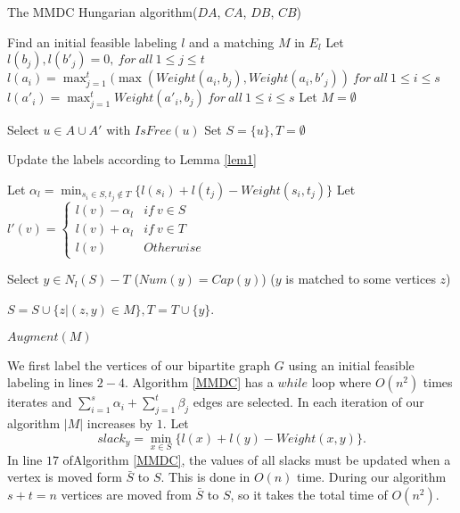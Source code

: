 \documentclass[preprint,12pt]{elsarticle}
\begin{document}
\begin{algorithm}
\caption{The MMDC Hungarian algorithm($DA$, $CA$, $DB$, $CB$)}
\label{MMDC}
\begin{algorithmic}[1]

\Initialize \Comment Find an initial feasible labeling $l$ and a matching $M$ in $E_l$
\State Let $l(b_j), l(b'_j)=0, \ for \ all \ 1 \le j \le t$
\State $l(a_i)=\max_{j=1}^t (\max(Weight(a_i,b_j),Weight(a_i,b'_j))\  for\  all \ 1 \le i \le s$
\State $l(a'_i)=\max_{j=1}^t Weight(a'_i,b_j)$$\  for\  all \ 1 \le i \le s$
\State Let $M=\emptyset$ 
\item[]

 \State Select $u  \in A\cup A'$ with $IsFree(u)$ 
 \State Set $S = \{u\}, T =\emptyset$
\item[]
  \Repeat
        \Statex \Comment Update the labels according to Lemma \ref{lem1}

\State Let $\alpha_l=\min_{s_i \in S, t_j \notin T}\{l(s_i)+l(t_j)-Weight(s_i,t_j)\}$
\State Let
$l'(v)=\left\{ 
\begin{array}{lr}
l(v)-\alpha_l & if \  v \in S
 \\ 
 l(v)+\alpha_l & if\  v  \in T 
 \\ 
 l(v) & Otherwise 
 \end{array}
\right.$ 

        \EndWhile
\item[]
         \State Select $y  \in N_l (S)-T$
          \Comment ($Num(y)=Cap(y)$)
\Statex\Comment ($y$ is matched to some vertices $z$)

            \State $S = S \cup \{z|(z,y) \in M\},T = T \cup \{y\}$.
           \EndIf
\item[]
    \State $Augment(M)$
    \EndWhile

\end{algorithmic}
\end{algorithm}


We first label the vertices of our bipartite graph $G$ using an initial feasible labeling in lines $2-4$. Algorithm \ref{MMDC} has a $while$ loop where $O(n^2)$ times iterates and $\sum_{i=1}^s\alpha_i+\sum_{j=1}^t\beta_j$ edges are selected. In each iteration of our algorithm $|M|$ increases by $1$. Let $$slack_y=\min_{x \in S}\{l(x)+l(y)-Weight(x,y)\}.$$ In line $17$ ofAlgorithm \ref{MMDC}, the values of all slacks must be updated when a vertex is moved form $\bar S$ to $S$. This is done in $O(n)$ time. During our algorithm $s+t=n$ vertices are moved from $\bar S$ to $S$, so it takes the total time of $O(n^2)$. 
\end{document}
